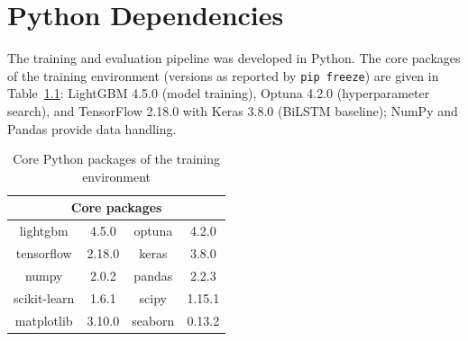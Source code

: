 \chapter{Python Dependencies}
\label{app:dependencies}

The training and evaluation pipeline was developed in Python. The core packages of the training environment (versions as reported by \texttt{pip freeze}) are given in Table~\ref{tab:dependencies}: LightGBM 4.5.0 (model training), Optuna 4.2.0 (hyperparameter search), and TensorFlow 2.18.0 with Keras 3.8.0 (BiLSTM baseline); NumPy and Pandas provide data handling.

\begin{table}[H]
    \centering
    \setcellgapes{3pt}
    \makegapedcells
    \begin{tabular}{c c c c}
    \hline
    \multicolumn{4}{c}{Core packages} \\
    \hline
    lightgbm & 4.5.0 & optuna & 4.2.0 \\
    tensorflow & 2.18.0 & keras & 3.8.0 \\
    numpy & 2.0.2 & pandas & 2.2.3 \\
    scikit-learn & 1.6.1 & scipy & 1.15.1 \\
    matplotlib & 3.10.0 & seaborn & 0.13.2 \\
    \hline
    \end{tabular}
    \caption{Core Python packages of the training environment}
    \label{tab:dependencies}
\end{table}



